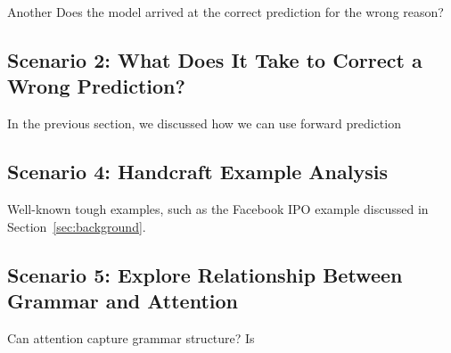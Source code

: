 
Another
Does the model arrived at the correct prediction for the wrong reason?

\subsection{Scenario 2: What Does It Take to Correct a Wrong Prediction?}
In the previous section, we discussed how we can use forward prediction



\subsection{Scenario 4: Handcraft Example Analysis}
Well-known tough examples, such as the Facebook IPO example discussed in Section~\ref{sec:background}.

\subsection{Scenario 5: Explore Relationship Between Grammar and Attention}
Can attention capture grammar structure? Is 
